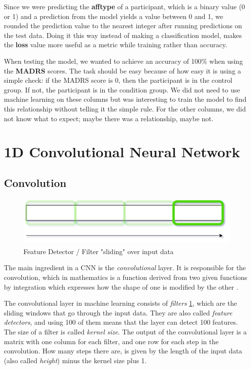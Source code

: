 Since we were predicting the \textbf{afftype} of a participant, which is a binary value (0 or 1) and a prediction from the model yields a value between 0 and 1, we rounded the prediction value to the nearest integer after running predictions on the test data. Doing it this way instead of making a classification model, makes the \textbf{loss} value more useful as a metric while training rather than accuracy. 

When testing the model, we wanted to achieve an accuracy of 100\% when using the \textbf{MADRS} scores. The task should be easy because of how easy it is using a simple check: if the MADRS score is 0, then the participant is in the control group. If not, the participant is in the condition group. We did not need to use machine learning on these columns but was interesting to train the model to find this relationship without telling it the simple rule. For the other columns, we did not know what to expect; maybe there was a relationship, maybe not.

\section{1D Convolutional Neural Network}

\subsection{Convolution}

\begin{figure}[h]
    \includegraphics[height=2.5cm]{img/feature_detector.png}
    \caption{Feature Detector / Filter "sliding" over input data}
    \label{figure:feature_detector}
\end{figure}

\noindent The main ingredient in a CNN is the \textit{convolutional} layer. It is responsible for the convolution, which in mathematics is a function derived from two given functions by integration which expresses how the shape of one is modified by the other \cite{convolution_definition}. 

The convolutional layer in machine learning consists of \textit{filters} \ref{figure:feature_detector}, which are the sliding windows that go through the input data.  They are also called \textit{feature detectors}, and using 100 of them means that the layer can detect 100 features. The size of a filter is called \textit{kernel size}. The output of the convolutional layer is a matrix with one column for each filter, and one row for each step in the convolution. How many steps there are, is given by the length of the input data (also called \textit{height}) minus the kernel size plus 1.

